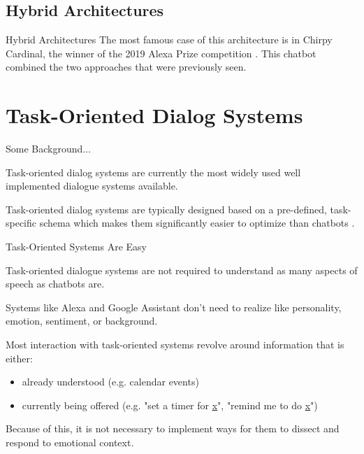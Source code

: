 \documentclass[10pt]{beamer}
\begin{document}
\subsection{Hybrid Architectures}

\begin{frame}{Hybrid Architectures}
The most famous case of this architecture is in Chirpy Cardinal, the winner of the 2019 Alexa Prize competition \cite{chirpy}.  This chatbot combined the two approaches that were previously seen.

\end{frame}





\section{Task-Oriented Dialog Systems}

 

\begin{frame}{Some Background...}

Task-oriented dialog systems are currently the most widely used well implemented dialogue systems available.

 

Task-oriented dialog systems are typically designed based on a pre-defined, task-specific schema which makes them significantly easier to optimize than chatbots \cite{10.1145/3383123}.

\end{frame}

 

\begin{frame}{Task-Oriented Systems Are Easy}

Task-oriented dialogue systems are not required to understand as many aspects of speech as chatbots are.

 

Systems like Alexa and Google Assistant don't need to realize like personality, emotion, sentiment, or background.

 

Most interaction with task-oriented systems revolve around information that is either:

    \begin{itemize}

        \item already understood (e.g. calendar events)

        \item currently being offered (e.g. "set a timer for \underline{x}", "remind me to do \underline{x}")

    \end{itemize}

Because of this, it is not necessary to implement ways for them to dissect and respond to emotional context.

\end{frame}
\end{document}
